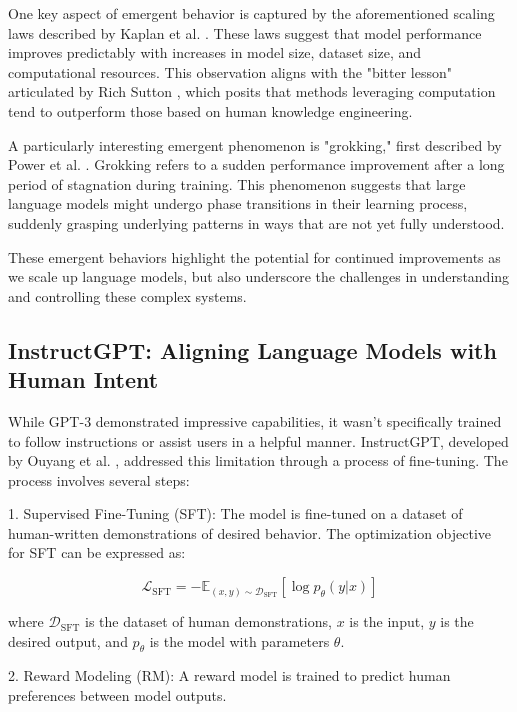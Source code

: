 \documentclass[a4paper, oneside]{discothesis}
\begin{document}
One key aspect of emergent behavior is captured by the aforementioned scaling laws described by Kaplan et al. \cite{kaplan2020scaling}. These laws suggest that model performance improves predictably with increases in model size, dataset size, and computational resources. This observation aligns with the "bitter lesson" articulated by Rich Sutton \cite{sutton2019bitter}, which posits that methods leveraging computation tend to outperform those based on human knowledge engineering.

A particularly interesting emergent phenomenon is "grokking," first described by Power et al. \cite{power2022grokking}. Grokking refers to a sudden performance improvement after a long period of stagnation during training. This phenomenon suggests that large language models might undergo phase transitions in their learning process, suddenly grasping underlying patterns in ways that are not yet fully understood.

These emergent behaviors highlight the potential for continued improvements as we scale up language models, but also underscore the challenges in understanding and controlling these complex systems.

\subsection{InstructGPT: Aligning Language Models with Human Intent}
While GPT-3 demonstrated impressive capabilities, it wasn't specifically trained to follow instructions or assist users in a helpful manner. 
InstructGPT, developed by Ouyang et al. \cite{ouyang2022training}, addressed this limitation through a process of fine-tuning.
The process involves several steps:

1. Supervised Fine-Tuning (SFT): The model is fine-tuned on a dataset of human-written demonstrations of desired behavior. The optimization objective for SFT can be expressed as:

   \[\mathcal{L}_{\text{SFT}} = -\mathbb{E}_{(x,y)\sim \mathcal{D}_{\text{SFT}}}[\log p_\theta(y|x)]\]

   where $\mathcal{D}_{\text{SFT}}$ is the dataset of human demonstrations, $x$ is the input, $y$ is the desired output, and $p_\theta$ is the model with parameters $\theta$.

2. Reward Modeling (RM): A reward model is trained to predict human preferences between model outputs.
\end{document}
